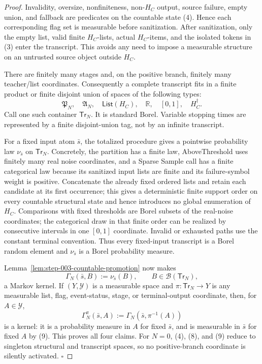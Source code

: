 \begin{proof}
Invalidity, oversize, nonfiniteness, non-\(H_C\) output, source failure,
empty union, and fallback are predicates on the countable state (4). Hence
each corresponding flag set is measurable before sanitization. After
sanitization, only the empty list, valid finite \(H_C\)-lists, actual
\(H_C\)-items, and the isolated tokens in (3) enter the transcript. This
avoids any need to impose a measurable structure on an untrusted source
object outside \(H_C\).

There are finitely many stages and, on the positive branch, finitely many
teacher/list coordinates. Consequently a complete transcript fits in a
finite product or finite disjoint union of spaces of the following types:
\[
\mathfrak P_N,\quad \mathfrak A_N,\quad
\mathsf{List}(H_C),\quad \mathbb R,\quad [0,1],\quad H_C^\dagger.
\tag{8}
\]
Call one such container \(\mathsf{Tr}_N\). It is standard Borel. Variable
stopping times are represented by a finite disjoint-union tag, not by an
infinite transcript.

For a fixed input atom \(\bar s\), the  totalized procedure gives a
pointwise probability law \(\nu_{\bar s}\) on \(\mathsf{Tr}_N\). Concretely,
the partition has a finite law, AboveThreshold uses finitely many real
noise coordinates, and a Sparse Sample call has a finite categorical law
because its sanitized input lists are finite and its failure-symbol weight
is positive. Concatenate the already fixed ordered lists and retain each
candidate at its first occurrence; this gives a deterministic finite support
order on every countable structural state and hence introduces no global
enumeration of \(H_C\). Comparisons with fixed thresholds are Borel subsets
of the real-noise coordinates; the categorical draw in that finite order can
be realized by consecutive intervals in one \([0,1]\) coordinate. Invalid
or exhausted paths use the constant terminal convention. Thus every
fixed-input transcript is a Borel random element and \(\nu_{\bar s}\) is a
Borel probability measure.

Lemma~\ref{lem:step-003-countable-promotion} now makes
\[
\Gamma_N(\bar s,B):=\nu_{\bar s}(B),
\qquad B\in\mathcal B(\mathsf{Tr}_N),
\tag{9}
\]
a Markov kernel. If \((Y,\mathcal Y)\) is a measurable space and
\(\pi:\mathsf{Tr}_N\to Y\) is any measurable list, flag, event-status,
stage, or terminal-output coordinate, then, for \(A\in\mathcal Y\),
\[
\Gamma_N^\pi(\bar s,A)
:=\Gamma_N(\bar s,\pi^{-1}(A))
\tag{10}
\]
is a kernel: it is a probability measure in \(A\) for fixed \(\bar s\), and
is measurable in \(\bar s\) for fixed \(A\) by (9). This proves all four
claims. For \(N=0\), (4), (8), and (9) reduce to singleton structural and
transcript spaces, so no positive-branch coordinate is silently activated.
\(\square\)


\end{proof}

